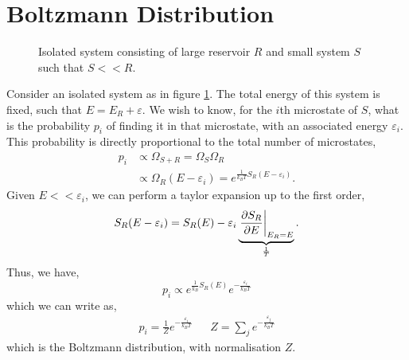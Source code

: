 \documentclass{book}
\begin{document}
\section{Boltzmann Distribution}
	\begin{figure}
		\centering
		\caption{Isolated system consisting of large reservoir $R$ and small system $S$ such that $S << R$.}
		\label{fig:isolated2}
	\end{figure}
Consider an isolated system as in figure \ref{fig:isolated2}. The total energy of this system is fixed, such that $E = E_R + \varepsilon$. We wish to know, for the $i$th microstate of $S$, what is the probability $p_i$ of finding it in that microstate, with an associated energy $\varepsilon_i$. This probability is directly proportional to the total number of microstates,
\begin{equation}
	\begin{split}
		p_i & \propto \Omega_{S+R} = \Omega_S\Omega_R \\
		& \propto \Omega_R(E - \varepsilon_i) = e^{\frac{1}{k_BT}S_R(E - \varepsilon_i)}.
	\end{split}
\end{equation}
Given $E << \varepsilon_i$, we can perform a taylor expansion up to the first order,
\begin{equation}
	S_R(E - \varepsilon_i) = S_R(E) - \varepsilon_i\underbrace{\eval{\pdv{S_R}{E}}_{E_R = E}}_{\frac{1}{T}}.
\end{equation}
Thus, we have,
\begin{equation}
	p_i \propto e^{\frac{1}{k_B}S_R(E)}e^{-\frac{\varepsilon_i}{k_BT}}
\end{equation}
which we can write as,
\begin{align}
	p_i= \frac{1}{Z}e^{-\frac{\varepsilon_i}{k_BT}} && Z = \sum_je^{-\frac{\varepsilon_j}{k_BT}} \label{eq:Z}
\end{align}
which is the Boltzmann distribution, with normalisation $Z$.
\end{document}
